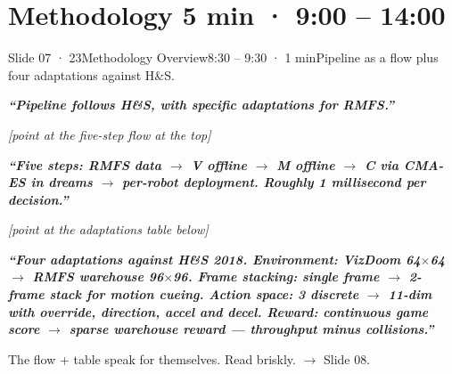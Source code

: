 \documentclass[11pt,a4paper]{article}
\newcommand{\say}[1]{%
    \par\vspace{0.3em}%
    \begingroup
    \leftskip=12pt
    \rightskip=8pt
    \color{thStrong}%
    \itshape\textbf{“#1”}%
    \par
    \endgroup
    \vspace{0.2em}
}
\newcommand{\stage}[1]{%
    \par\textcolor{thMuted}{\small\textit{[#1]}}\par
    \vspace{0.2em}
}
\newcommand{\emphw}[1]{\textbf{\textcolor{thAmber}{#1}}}
\begin{document}
\section{Methodology \hfill \textcolor{thMuted}{\small 5 min · 9:00 – 14:00}}

\begin{slide}{Slide 07 · 23}{Methodology Overview}{8:30 – 9:30 · 1 min}{Pipeline as a flow plus four adaptations against H\&S.}
\say{Pipeline follows H\&S, with \textbf{specific adaptations for RMFS}.}

\stage{point at the five-step flow at the top}

\say{Five steps: \textbf{RMFS data $\rightarrow$ V offline $\rightarrow$ M offline $\rightarrow$ C via CMA-ES in dreams $\rightarrow$ per-robot deployment}. Roughly 1 millisecond per decision.}

\stage{point at the adaptations table below}

\say{Four adaptations against H\&S 2018. \textbf{Environment}: VizDoom 64$\times$64 $\rightarrow$ \emphw{RMFS warehouse 96$\times$96}. \textbf{Frame stacking}: single frame $\rightarrow$ \emphw{2-frame stack for motion cueing}. \textbf{Action space}: 3 discrete $\rightarrow$ \emphw{11-dim} with override, direction, accel and decel. \textbf{Reward}: continuous game score $\rightarrow$ \emphw{sparse warehouse reward} — throughput minus collisions.}

\begin{stagebox}
The flow + table speak for themselves. Read briskly. $\rightarrow$ Slide 08.
\end{stagebox}
\end{slide}
\end{document}
